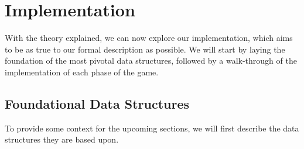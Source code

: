 \section{Implementation}\label{sec:implementation}
With the theory explained, we can now explore our implementation, which aims to
be as true to our formal description as possible. We will start by laying the
foundation of the most pivotal data structures, followed by a walk-through of
the implementation of each phase of the game.

\subsection{Foundational Data Structures}\label{sec:foundationalDataStructures}
To provide some context for the upcoming sections, we will first describe the
data structures they are based upon.

